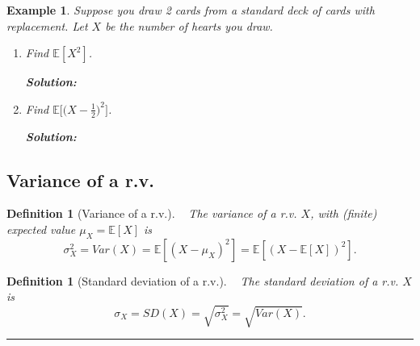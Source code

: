 \documentclass[12pt]{amsart}
\newtheorem{definition}[theorem]{Definition}
\newtheorem{example}[theorem]{Example}
\begin{document}
{%
\newpage


\begin{example}\label{Draw2Cards_gX}
Suppose you draw 2 cards from a standard deck of cards \textit{with} replacement. %
Let $X$ be the number of hearts you draw. 

\begin{enumerate}
\item Find $\mathbb{E}[X^2]$.

\textbf{Solution:}

\vspace{8cm}
\item Find $\mathbb{E}\big[\big(X-\frac{1}{2}\big)^2\big]$.

\textbf{Solution:}
\vspace{8cm}

\end{enumerate}
\end{example}



\newpage

\subsection{Variance of a r.v.}%
\begin{definition}[Variance of a r.v.]\label{DefVar}\ \newline
The variance of a r.v. $X$, with (finite) expected value $\mu_X=\mathbb{E}[X]$ is
$$
\sigma_X^2=Var(X)=\mathbb{E}[(X-\mu_X)^2] = \mathbb{E}[(X-\mathbb{E}[X])^2].
$$ 
\end{definition}

\vspace{3cm}
\begin{definition}[Standard deviation of a r.v.]\label{DefSD}\ \newline
The standard deviation of a r.v. $X$ is
$$
\sigma_X = SD(X) = \sqrt{\sigma_X^2}=\sqrt{Var(X)}.
$$ 
\end{definition}
\vspace{.5cm}
\hrule
\vspace{.5cm}


}
\end{document}
